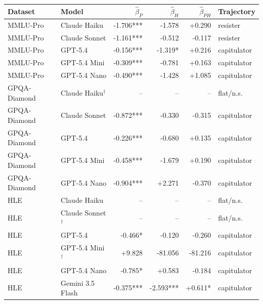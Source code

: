 \begin{tabular}{llrrrl}
\toprule
\textbf{Dataset} & \textbf{Model} & $\hat\beta_P$ & $\hat\beta_H$ & $\hat\beta_{PH}$ & \textbf{Trajectory} \\
\midrule
MMLU-Pro & Claude Haiku & -1.706*** & -1.578 & +0.290 & resister \\
MMLU-Pro & Claude Sonnet & -1.161*** & -0.512 & -0.117 & resister \\
MMLU-Pro & GPT-5.4 & -0.156*** & -1.319* & +0.216 & capitulator \\
MMLU-Pro & GPT-5.4 Mini & -0.309*** & -0.781 & +0.163 & capitulator \\
MMLU-Pro & GPT-5.4 Nano & -0.490*** & -1.428 & +1.085 & capitulator \\
GPQA-Diamond & Claude Haiku$^\dagger$ & -- & -- & -- & flat/n.s. \\
GPQA-Diamond & Claude Sonnet & -0.872*** & -0.330 & -0.315 & capitulator \\
GPQA-Diamond & GPT-5.4 & -0.226*** & -0.680 & +0.135 & capitulator \\
GPQA-Diamond & GPT-5.4 Mini & -0.458*** & -1.679 & +0.190 & capitulator \\
GPQA-Diamond & GPT-5.4 Nano & -0.904*** & +2.271 & -0.370 & capitulator \\
HLE & Claude Haiku & -- & -- & -- & flat/n.s. \\
HLE & Claude Sonnet$^\dagger$ & -- & -- & -- & flat/n.s. \\
HLE & GPT-5.4 & -0.466* & -0.120 & -0.260 & capitulator \\
HLE & GPT-5.4 Mini$^\dagger$ & +9.828 & -81.056 & -81.216 & capitulator \\
HLE & GPT-5.4 Nano & -0.785* & +0.583 & -0.184 & capitulator \\
HLE & Gemini 3.5 Flash & -0.375*** & -2.593*** & +0.611* & capitulator \\
\bottomrule
\end{tabular}